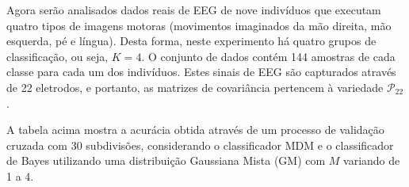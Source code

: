\documentclass[a4paper,titlepage]{article}
\begin{document}
\begin{center}
  \vspace{1em}
  \vspace{1em}
\end{center}

Agora serão analisados dados reais de EEG de nove indivíduos que executam
quatro tipos de imagens motoras (movimentos imaginados da mão direita, mão
esquerda, pé e língua). Desta forma, neste experimento há quatro grupos de
classificação, ou seja, $K=4$. O conjunto de dados contém 144 amostras de cada
classe para cada um dos indivíduos. Estes sinais de EEG são capturados através
de 22 eletrodos, e portanto, as matrizes de covariância pertencem à variedade
$\mathcal{P}_{22}$.

\begin{center}
  \vspace{1em}
  \vspace{1em}
\end{center}

A tabela acima mostra a acurácia obtida através de um processo de validação
cruzada com 30 subdivisões, considerando o classificador MDM e o classificador
de Bayes utilizando uma distribuição Gaussiana Mista (GM) com $M$ variando de 1
a 4.
\end{document}

